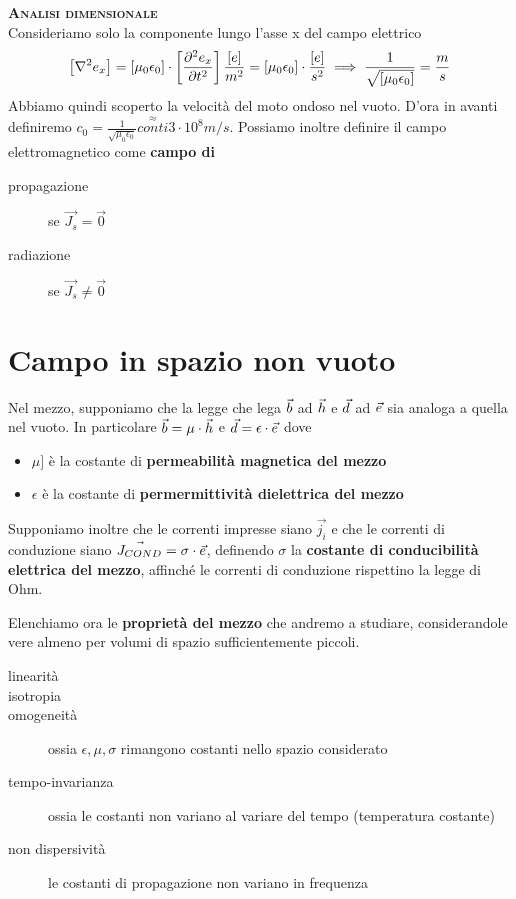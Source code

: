\textbf{\textsc{Analisi dimensionale}}\\
Consideriamo solo la componente lungo l'asse x del campo elettrico
\begin{equation}
  \left[\nabla^2 e_x\right] = \left[\mu_0\epsilon_0\right]  \cdot \left[\deriv[2]{e_x}{t}\right] \\
  \frac{[e]}{m^2} = [\mu_0\epsilon_0] \cdot \frac{[e]}{s^2} \implies \frac{1}{\sqrt{[\mu_0\epsilon_0]}} = \frac{m}{s}
\end{equation}
Abbiamo quindi scoperto la velocità del moto ondoso nel vuoto. D'ora in avanti definiremo
$c_0 = \frac{1}{\sqrt{\mu_0\epsilon_0}}\stackrel{\approx}{conti} 3 \cdot 10^8 m/s$.
Possiamo inoltre definire il campo elettromagnetico come \textbf{campo di}
\begin{description}
  \item[propagazione] se $\vec{J_s}=\vec{0}$
  \item[radiazione] se $\vec{J_s}\neq\vec{0}$
\end{description}

\section{Campo in spazio non vuoto}
Nel mezzo, supponiamo che la legge che lega $\b$ ad $\h$ e $\d$ ad $\e$ sia analoga a quella nel vuoto.
In particolare $\b=\mu\cdot\h$ e $\d=\epsilon\cdot\e$ dove
\begin{itemize}
  \item $\mu ]$ è la costante di \textbf{permeabilità  magnetica del mezzo}
  \item $\epsilon$ è la costante di \textbf{permermittività  dielettrica del mezzo}
\end{itemize}
Supponiamo inoltre che le correnti impresse siano $\vec{j_i}$ e che le correnti di conduzione siano
$\vec{J_{COND}} = \sigma \cdot \e$, definendo $\sigma$ la \textbf{costante di conducibilità elettrica
del mezzo}, affinché le correnti di conduzione rispettino la legge di Ohm.

Elenchiamo ora le \textbf{proprietà del mezzo} che andremo a studiare, considerandole vere almeno per volumi
di spazio sufficientemente piccoli.
\begin{description}
  \item[linearità]
  \item[isotropia]
  \item[omogeneità] ossia $\epsilon, \mu, \sigma$ rimangono costanti nello spazio considerato
  \item[tempo-invarianza] ossia le costanti non variano al variare del tempo (temperatura costante)
  \item[non dispersività] le costanti di propagazione non variano in frequenza
\end{description}

